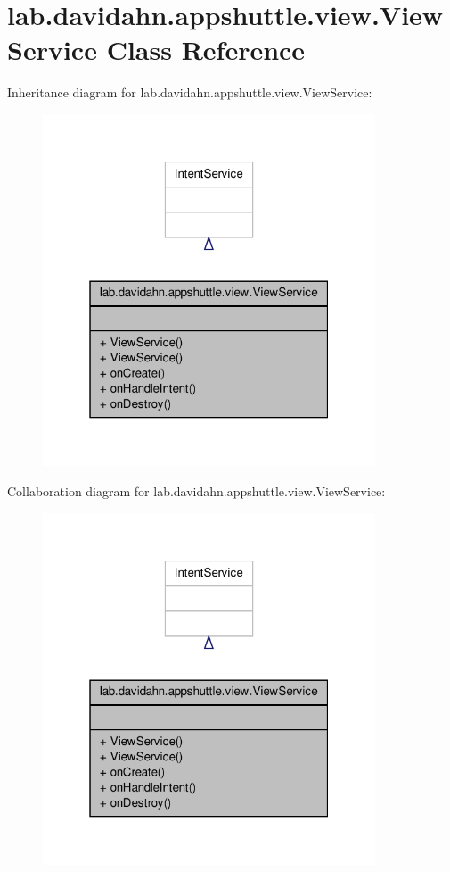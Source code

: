 \hypertarget{classlab_1_1davidahn_1_1appshuttle_1_1view_1_1_view_service}{\section{lab.\-davidahn.\-appshuttle.\-view.\-View\-Service \-Class \-Reference}
\label{classlab_1_1davidahn_1_1appshuttle_1_1view_1_1_view_service}
}


\-Inheritance diagram for lab.\-davidahn.\-appshuttle.\-view.\-View\-Service\-:
\nopagebreak
\begin{figure}[H]
\begin{center}
\leavevmode
\includegraphics[width=280pt]{classlab_1_1davidahn_1_1appshuttle_1_1view_1_1_view_service__inherit__graph}
\end{center}
\end{figure}


\-Collaboration diagram for lab.\-davidahn.\-appshuttle.\-view.\-View\-Service\-:
\nopagebreak
\begin{figure}[H]
\begin{center}
\leavevmode
\includegraphics[width=280pt]{classlab_1_1davidahn_1_1appshuttle_1_1view_1_1_view_service__coll__graph}
\end{center}
\end{figure}
